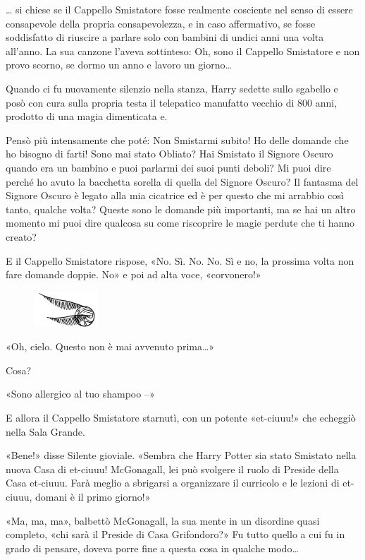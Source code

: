 … si chiese se il Cappello Smistatore fosse realmente cosciente nel senso di essere consapevole della propria consapevolezza, e in caso affermativo, se fosse soddisfatto di riuscire a parlare solo con bambini di undici anni una volta all’anno. La sua canzone l’aveva sottinteso: Oh, sono il Cappello Smistatore e non provo scorno, se dormo un anno e lavoro un giorno…

Quando ci fu nuovamente silenzio nella stanza, Harry sedette sullo sgabello e posò con cura sulla propria testa il telepatico manufatto vecchio di 800 anni, prodotto di una magia dimenticata e.

Pensò più intensamente che poté: Non Smistarmi subito! Ho delle domande che ho bisogno di farti! Sono mai stato Obliato? Hai Smistato il Signore Oscuro quando era un bambino e puoi parlarmi dei suoi punti deboli? Mi puoi dire perché ho avuto la bacchetta sorella di quella del Signore Oscuro? Il fantasma del Signore Oscuro è legato alla mia cicatrice ed è per questo che mi arrabbio così tanto, qualche volta? Queste sono le domande più importanti, ma se hai un altro momento mi puoi dire qualcosa su come riscoprire le magie perdute che ti hanno creato?

E il Cappello Smistatore rispose, «No. Sì. No. No. Sì e no, la prossima volta non fare domande doppie. No» e poi ad alta voce, «corvonero!»

\begin{figure}[h]
	\includegraphics[scale=0.4]{boccino.png}
	\centering
\end{figure}

«Oh, cielo. Questo non è mai avvenuto prima…»

Cosa?

«Sono allergico al tuo shampoo –»

E allora il Cappello Smistatore starnutì, con un potente «et-ciuuu!» che echeggiò nella Sala Grande.

«Bene!» disse Silente gioviale. «Sembra che Harry Potter sia stato Smistato nella nuova Casa di et-ciuuu! McGonagall, lei può svolgere il ruolo di Preside della Casa et-ciuuu. Farà meglio a sbrigarsi a organizzare il curricolo e le lezioni di et-ciuuu, domani è il primo giorno!»

«Ma, ma, ma», balbettò McGonagall, la sua mente in un disordine quasi completo, «chi sarà il Preside di Casa Grifondoro?» Fu tutto quello a cui fu in grado di pensare, doveva porre fine a questa cosa in qualche modo…

